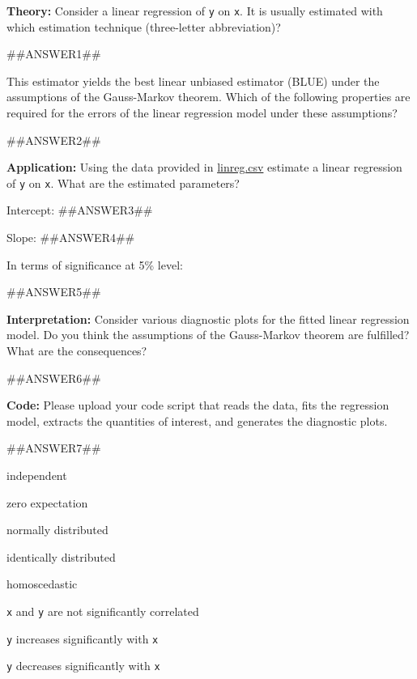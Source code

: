 
\begin{question}
\textbf{Theory:} Consider a linear regression of \texttt{y} on \texttt{x}. It is usually estimated with
which estimation technique (three-letter abbreviation)?

##ANSWER1##

This estimator yields the best linear unbiased estimator (BLUE) under the assumptions
of the Gauss-Markov theorem. Which of the following properties are required for the
errors of the linear regression model under these assumptions?

##ANSWER2##

\textbf{Application:} Using the data provided in \url{linreg.csv} estimate a
linear regression of \texttt{y} on \texttt{x}. What are the estimated parameters?

Intercept: ##ANSWER3##

Slope: ##ANSWER4##

In terms of significance at 5\% level:

##ANSWER5##

\textbf{Interpretation:} Consider various diagnostic plots for the fitted linear
regression model. Do you think the assumptions of the Gauss-Markov theorem are
fulfilled? What are the consequences?

##ANSWER6##

\textbf{Code:} Please upload your code script that reads the data, fits the regression model,
extracts the quantities of interest, and generates the diagnostic plots.

##ANSWER7##

\begin{answerlist}
  \item 
  \item independent
  \item zero expectation
  \item normally distributed
  \item identically distributed
  \item homoscedastic
  \item 
  \item 
  \item \texttt{x} and \texttt{y} are not significantly correlated
  \item \texttt{y} increases significantly with \texttt{x}
  \item \texttt{y} decreases significantly with \texttt{x}
  \item 
  \item 
\end{answerlist}
\end{question}

